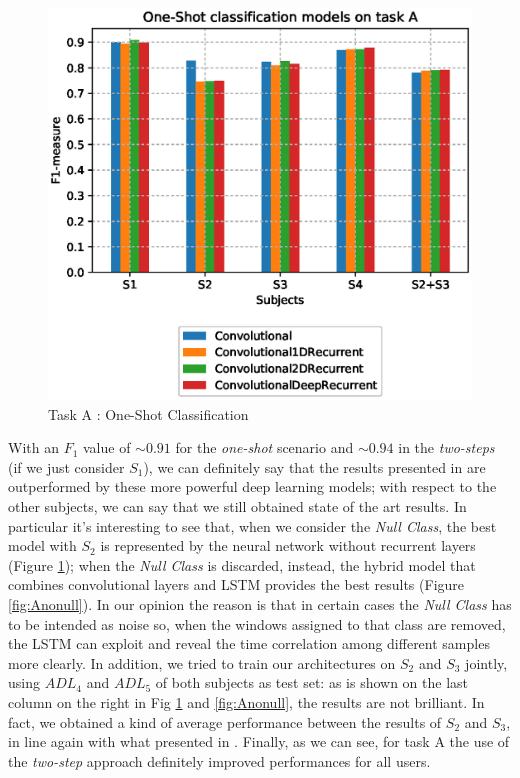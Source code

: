 \begin{figure}[ht]
	\centering
	\includegraphics[scale=.4]{figure/A_models_nullclass}
	\caption{Task A : One-Shot Classification}
	\label{fig:Anull}
\end{figure}

With an $F_1$ value of $\sim 0.91$ for the \textit{one-shot} scenario and $\sim 0.94$ in the \textit{two-steps} (if we just consider $S_1$), we can definitely say that the results presented in \cite{Chavarriaga2013} are outperformed by these more powerful deep learning models; with respect to the other subjects, we can say that we still obtained state of the art results. In particular it's interesting to see that, when we consider the \textit{Null Class}, the best model with $S_2$ is represented by the neural network without recurrent layers (Figure \ref{fig:Anull}); when the \textit{Null Class} is discarded, instead, the hybrid model that combines convolutional layers and LSTM provides the best results (Figure \ref{fig:Anonull}). In our opinion the reason is that in certain cases the \textit{Null Class} has to be intended as noise so, when the windows assigned to that class are removed, the LSTM can exploit and reveal the time correlation among different samples more clearly. In addition, we tried to train our architectures on $S_2$ and $S_3$ jointly, using $ADL_4$ and $ADL_5$ of both subjects as test set: as is shown on the last column on the right in Fig \ref{fig:Anull} and \ref{fig:Anonull}, the results are not brilliant. In fact, we obtained a kind of average performance between the results of $S_2$ and $S_3$, in line again with what presented in \cite{Chavarriaga2013}. Finally, as we can see, for task A the use of the \textit{two-step} approach definitely improved performances for all users. 

